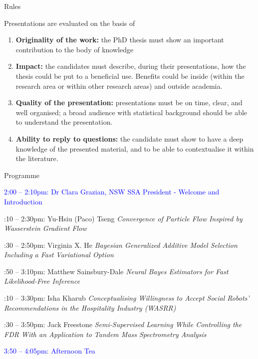 \documentclass[english]{beamer}
\begin{document}
\begin{frame}{Rules}

Presentations are evaluated on the basis of

\begin{enumerate}
    \item \textbf{Originality of the work:} the PhD thesis must show an important contribution to the body of knowledge
    
    \smallskip
    
    \item \textbf{Impact:} the candidates must describe, during their presentations, how the thesis could be put to a beneficial use. Benefits could be inside (within the research area or within other research areas) and outside academia. 

    \smallskip

    \item \textbf{Quality of the presentation:} presentations must be on time, clear, and well organised; a broad audience with statistical background should be able to understand the presentation.  

	\smallskip
	
	\item  \textbf{Ability to reply to questions:} the candidate must show to have a deep knowledge of the presented material, and to be able to contextualise it within the literature. 

\end{enumerate}

\end{frame}


\begin{frame}{Programme}
	\footnotesize
	
	\textcolor{blue}{2:00 -- 2:10pm:} \textcolor{blue}{Dr Clara Grazian, NSW SSA President - Welcome and Introduction}
	
	:10 -- 2:30pm: Yu-Hsiu (Paco) Tseng \textit{Convergence of Particle Flow Inspired by Wasserstein Gradient Flow}
	
	:30 -- 2:50pm: Virginia X. He \textit{Bayesian Generalized Additive Model Selection Including a Fast Variational Option}
	
	:50 -- 3:10pm: Matthew Sainsbury-Dale \textit{Neural Bayes Estimators for Fast Likelihood-Free Inference}
	
	:10 -- 3:30pm: Isha Kharub \textit{Conceptualising Willingness to Accept Social Robots' Recommendations in the Hospitality Industry (WASRR)}
	
	:30 -- 3:50pm: Jack Freestone \textit{Semi-Supervised Learning While Controlling the FDR With an Application to Tandem Mass Spectrometry Analysis}
	
	\smallskip
	\textcolor{blue}{3:50 -- 4:05pm:} \textcolor{blue}{Afternoon Tea}
\end{frame}
\end{document}

